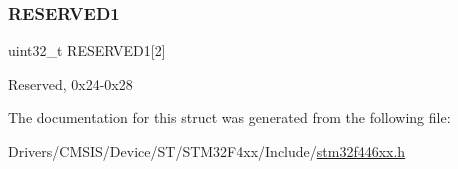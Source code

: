 \subsubsection{\texorpdfstring{R\+E\+S\+E\+R\+V\+E\+D1}{RESERVED1}}
{\footnotesize\ttfamily uint32\+\_\+t R\+E\+S\+E\+R\+V\+E\+D1\mbox{[}2\mbox{]}}

Reserved, 0x24-\/0x28 

The documentation for this struct was generated from the following file\+:\begin{DoxyCompactItemize}
\item 
Drivers/\+C\+M\+S\+I\+S/\+Device/\+S\+T/\+S\+T\+M32\+F4xx/\+Include/\mbox{\hyperlink{stm32f446xx_8h}{stm32f446xx.\+h}}\end{DoxyCompactItemize}
